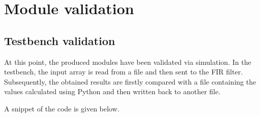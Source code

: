 \documentclass[11pt, a4paper]{article}
\begin{document}
\section{Module validation}

\subsection{Testbench validation}

At this point, the produced modules have been validated via simulation. In the testbench, the input array is read from a file and then sent to the FIR filter. Subsequently, the obtained results are firstly compared with a file containing the values calculated using Python and then written back to another file.  

A snippet of the code is given below.
\end{document}
